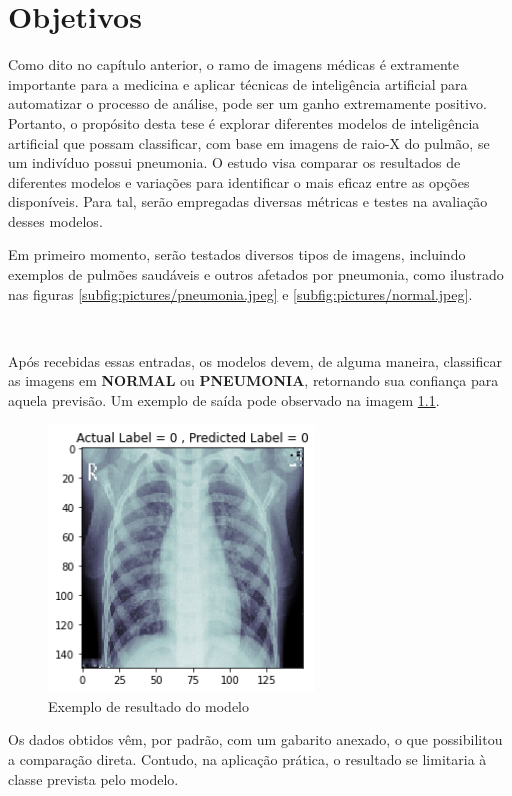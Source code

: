 \chapter{Objetivos}
\label{cha:Objetivos}

Como dito no capítulo anterior, o ramo de imagens médicas é extramente importante para a medicina e aplicar técnicas de inteligência artificial para automatizar o processo de análise, pode ser um ganho extremamente positivo. Portanto, o propósito desta tese é explorar diferentes modelos de inteligência artificial que possam classificar, com base em imagens de raio-X do pulmão, se um indivíduo possui pneumonia. O estudo visa comparar os resultados de diferentes modelos e variações para identificar o mais eficaz entre as opções disponíveis. Para tal, serão empregadas diversas métricas e testes na avaliação desses modelos. 

Em primeiro momento, serão testados diversos tipos de imagens, incluindo exemplos de pulmões saudáveis e outros afetados por pneumonia, como ilustrado nas figuras \ref{subfig:pictures/pneumonia.jpeg} e \ref{subfig:pictures/normal.jpeg}.

{
  \\
}


Após recebidas essas entradas, os modelos devem, de alguma maneira, classificar as imagens em \textbf{NORMAL} ou \textbf{PNEUMONIA}, retornando sua confiança para aquela previsão. Um exemplo de saída pode observado na imagem \ref{pic:resultado_modelo}.

\newpage 

\begin{figure}[!ht]
    \begin{center}
    \includegraphics[width=200pt]{pictures/resultado_exemplo.png}
    \caption{Exemplo de resultado do modelo}
    \label{pic:resultado_modelo}
    \end{center}
\end{figure}


Os dados obtidos vêm, por padrão, com um gabarito anexado, o que possibilitou a comparação direta. Contudo, na aplicação prática, o resultado se limitaria à classe prevista pelo modelo.